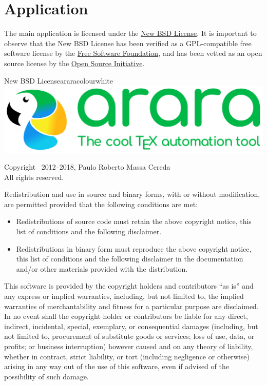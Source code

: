 \documentclass[a4paper,twoside,12pt]{memoir}
\begin{document}
\section*{Application}

The main application is licensed under the
\href{http://www.opensource.org/licenses/bsd-license.php}{New
BSD License}. It is important to observe that the New BSD
License has been verified as a GPL-compatible free software
license by the \href{http://www.fsf.org/}{Free Software
Foundation}, and has been vetted as an open source license
by the \href{http://www.opensource.org/}{Open Source
Initiative}.

\vspace{1em}

\begin{messagebox}{New BSD License}{araracolour}{\icinfo}{white}
\includegraphics[scale=0.25]{../logos/logo1.pdf}

Copyright \textcopyright\ 2012--2018, Paulo Roberto
Massa Cereda\\
All rights reserved.

\vspace{1em}

Redistribution and use in source and binary forms, with
or without modification, are permitted provided that the
following conditions are met:

\begin{itemize}
\item Redistributions of source code must retain the above
copyright notice, this list of conditions and the following
disclaimer.

\item Redistributions in binary form must reproduce the above
copyright notice, this list of conditions and the following
disclaimer in the documentation and/or other materials provided
with the distribution.
\end{itemize}

This software is provided by the copyright holders and
contributors ``as is'' and any express or implied warranties,
including, but not limited to, the implied warranties of
merchantability and fitness for a particular purpose are
disclaimed. In no event shall the copyright holder or
contributors be liable for any direct, indirect, incidental,
special, exemplary, or consequential damages (including, but
not limited to, procurement of substitute goods or services;
loss of use, data, or profits; or business interruption)
however caused and on any theory of liability, whether in
contract, strict liability, or tort (including negligence or
otherwise) arising in any way out of the use of this software,
even if advised of the possibility of such damage.
\end{messagebox}
\end{document}
